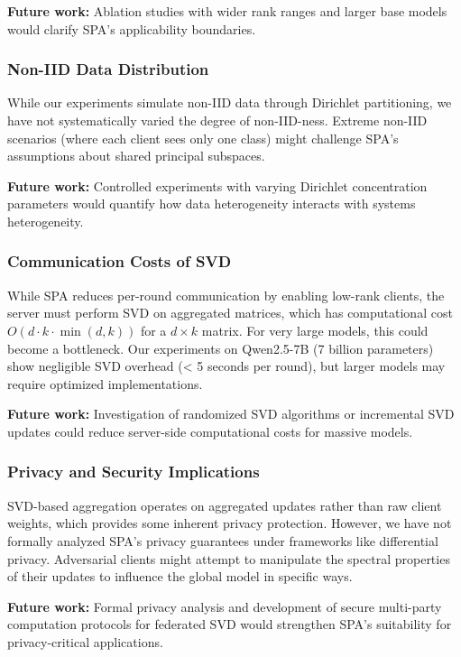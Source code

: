 \documentclass[conference]{IEEEtran}
\begin{document}
\textbf{Future work:} Ablation studies with wider rank ranges and larger base models would clarify SPA's applicability boundaries.

\subsubsection{Non-IID Data Distribution}

While our experiments simulate non-IID data through Dirichlet partitioning, we have not systematically varied the degree of non-IID-ness. Extreme non-IID scenarios (where each client sees only one class) might challenge SPA's assumptions about shared principal subspaces.

\textbf{Future work:} Controlled experiments with varying Dirichlet concentration parameters would quantify how data heterogeneity interacts with systems heterogeneity.

\subsubsection{Communication Costs of SVD}

While SPA reduces per-round communication by enabling low-rank clients, the server must perform SVD on aggregated matrices, which has computational cost $O(d \cdot k \cdot \min(d,k))$ for a $d \times k$ matrix. For very large models, this could become a bottleneck. Our experiments on Qwen2.5-7B (7 billion parameters) show negligible SVD overhead (< 5 seconds per round), but larger models may require optimized implementations.

\textbf{Future work:} Investigation of randomized SVD algorithms or incremental SVD updates could reduce server-side computational costs for massive models.

\subsubsection{Privacy and Security Implications}

SVD-based aggregation operates on aggregated updates rather than raw client weights, which provides some inherent privacy protection. However, we have not formally analyzed SPA's privacy guarantees under frameworks like differential privacy. Adversarial clients might attempt to manipulate the spectral properties of their updates to influence the global model in specific ways.

\textbf{Future work:} Formal privacy analysis and development of secure multi-party computation protocols for federated SVD would strengthen SPA's suitability for privacy-critical applications.
\end{document}
